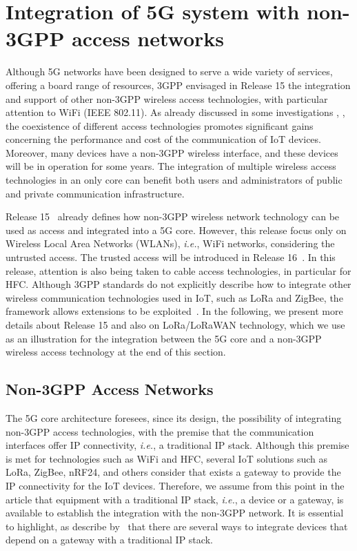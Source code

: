 \section{Integration of 5G system with non-3GPP access networks}\label{sec:integracao}

Although 5G networks have been designed to serve a wide variety of services, offering a board range of resources, 3GPP envisaged in Release 15 the integration and support of other non-3GPP wireless access technologies, with particular attention to WiFi (IEEE 802.11). As already discussed in some investigations \cite{parkvall2017nr}, \cite{ghosh20195g}, the coexistence of different access technologies promotes significant gains concerning the performance and cost of the communication of IoT devices. Moreover, many devices have a non-3GPP wireless interface, and these devices will be in operation for some years. The integration of multiple wireless access technologies in an only core can benefit both users and administrators of public and private communication infrastructure.

Release 15~\cite{3GPP:19} already defines how non-3GPP wireless network technology can be used as access and integrated into a 5G core. However, this release focus only on Wireless Local Area Networks (WLANs), \textit{i.e.}, WiFi networks, considering the untrusted access. The trusted access will be introduced in Release 16~\cite{WBA-NGMN:19}. In this release, attention is also being taken to cable access technologies, in particular for HFC. Although 3GPP standards do not explicitly describe how to integrate other wireless communication technologies used in IoT, such as LoRa and ZigBee, the framework allows extensions to be exploited~\cite{navarro-ortiz:18,yasmin:17}. In the following, we present more details about Release 15 and also on LoRa/LoRaWAN technology, which we use as an illustration for the integration between the 5G core and a non-3GPP wireless access technology at the end of this section.


\subsection{Non-3GPP Access Networks}\label{subsec:nao-3GPP}
 
The 5G core architecture foresees, since its design, the possibility of integrating non-3GPP access technologies, with the premise that the communication interfaces offer IP connectivity, \textit{i.e.}, a traditional IP stack. Although this premise is met for technologies such as WiFi and HFC, several IoT solutions such as LoRa, ZigBee, nRF24, and others consider that exists a gateway to provide the IP connectivity for the IoT devices. Therefore, we assume from this point in the article that equipment with a traditional IP stack, \textit{i.e.}, a device or a gateway, is available to establish the integration with the non-3GPP network. It is essential to highlight, as describe by~\cite{yasmin:17} that there are several ways to integrate devices that depend on a gateway with a traditional IP stack.

